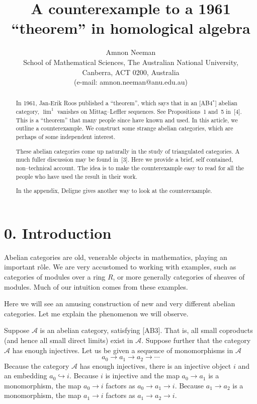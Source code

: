 \documentclass[11pt,a4paper]{article}
\title{A counterexample to a 1961 ``theorem'' in homological algebra}
\author{Amnon Neeman\\
\small School of Mathematical Sciences, The Australian National University,\\
\small Canberra, ACT 0200, Australia\\
\small (e-mail: amnon.neeman@anu.edu.au)}
\date{}
\theoremstyle{plain}
\theoremstyle{definition}
\numberwithin{equation}{section}
\begin{document}
\maketitle

\begin{abstract}
In 1961, Jan-Erik Roos published a ``theorem'', which says that in an [AB4$^{*}$] abelian category, $\lim\nolimits^{1}$ vanishes on Mittag--Leffler sequences. See Propositions~1 and~5 in~[4]. This is a ``theorem'' that many people since have known and used. In this article, we outline a counterexample. We construct some strange abelian categories, which are perhaps of some independent interest.

These abelian categories come up naturally in the study of triangulated categories. A much fuller discussion may be found in~[3]. Here we provide a brief, self contained, non--technical account. The idea is to make the counterexample easy to read for all the people who have used the result in their work.

In the appendix, Deligne gives another way to look at the counterexample.
\end{abstract}

\section*{0. Introduction}

Abelian categories are old, venerable objects in mathematics, playing an important r\^{o}le. We are very accustomed to working with examples, such as categories of modules over a ring $R$, or more generally categories of sheaves of modules. Much of our intuition comes from these examples.

Here we will see an amusing construction of new and very different abelian categories. Let me explain the phenomenon we will observe.

Suppose $\mathcal{A}$ is an abelian category, satisfying [AB3]. That is, all small coproducts (and hence all small direct limits) exist in $\mathcal{A}$. Suppose further that the category $\mathcal{A}$ has enough injectives. Let us be given a sequence of monomorphisms in $\mathcal{A}$
\begin{equation*}
a_{0} \longrightarrow a_{1} \longrightarrow a_{2} \longrightarrow \cdots
\end{equation*}
Because the category $\mathcal{A}$ has enough injectives, there is an injective object $i$ and an embedding $a_{0} \hookrightarrow i$. Because $i$ is injective and the map $a_{0} \to a_{1}$ is a monomorphism, the map $a_{0} \to i$ factors as $a_{0} \to a_{1} \to i$. Because $a_{1} \to a_{2}$ is a monomorphism, the map $a_{1} \to i$ factors as $a_{1} \to a_{2} \to i$.
\end{document}
